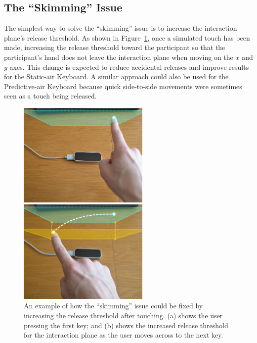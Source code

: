 \subsection{The ``Skimming'' Issue}
The simplest way to solve the ``skimming'' issue is to increase the interaction plane's release threshold. As shown in Figure~\ref{skimming_problem_fix}, once a simulated touch has been made, increasing the release threshold toward the participant so that the participant's hand does not leave the interaction plane when moving on the $x$ and $y$ axes. This change is expected to reduce accidental releases and improve results for the Static-air Keyboard. A similar approach could also be used for the Predictive-air Keyboard because quick side-to-side movements were sometimes seen as a touch being released.

\begin{figure}[!t]
	\centering
	\begin{minipage}[t]{2.5in}
		\includegraphics[width=2.5in]{Figures/fig_skimming_fix_before}
	\end{minipage}
	\begin{minipage}[t]{2.5in}
		\includegraphics[width=2.5in]{Figures/fig_skimming_fix_after}
	\end{minipage}
	\caption[``Skimming'' Solution]{An example of how the ``skimming'' issue could be fixed by increasing the release threshold after touching. (a) shows the user pressing the first key; and (b) shows the increased release threshold for the interaction plane as the user moves across to the next key.}
	\label{skimming_problem_fix}
\end{figure}

